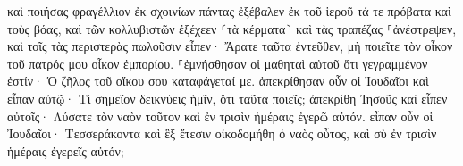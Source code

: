 \documentclass{openreader}
\begin{document}
καὶ ποιήσας φραγέλλιον ἐκ σχοινίων πάντας ἐξέβαλεν ἐκ τοῦ ἱεροῦ τά τε πρόβατα καὶ τοὺς βόας, καὶ τῶν κολλυβιστῶν ἐξέχεεν ⸂τὰ κέρματα⸃ καὶ τὰς τραπέζας ⸀ἀνέστρεψεν, 
καὶ τοῖς τὰς περιστερὰς πωλοῦσιν εἶπεν· Ἄρατε ταῦτα ἐντεῦθεν, μὴ ποιεῖτε τὸν οἶκον τοῦ πατρός μου οἶκον ἐμπορίου. 
⸀ἐμνήσθησαν οἱ μαθηταὶ αὐτοῦ ὅτι γεγραμμένον ἐστίν· Ὁ ζῆλος τοῦ οἴκου σου καταφάγεταί με. 
ἀπεκρίθησαν οὖν οἱ Ἰουδαῖοι καὶ εἶπαν αὐτῷ· Τί σημεῖον δεικνύεις ἡμῖν, ὅτι ταῦτα ποιεῖς; 
ἀπεκρίθη Ἰησοῦς καὶ εἶπεν αὐτοῖς· Λύσατε τὸν ναὸν τοῦτον καὶ ἐν τρισὶν ἡμέραις ἐγερῶ αὐτόν. 
εἶπαν οὖν οἱ Ἰουδαῖοι· Τεσσεράκοντα καὶ ἓξ ἔτεσιν οἰκοδομήθη ὁ ναὸς οὗτος, καὶ σὺ ἐν τρισὶν ἡμέραις ἐγερεῖς αὐτόν; 
\end{document}
